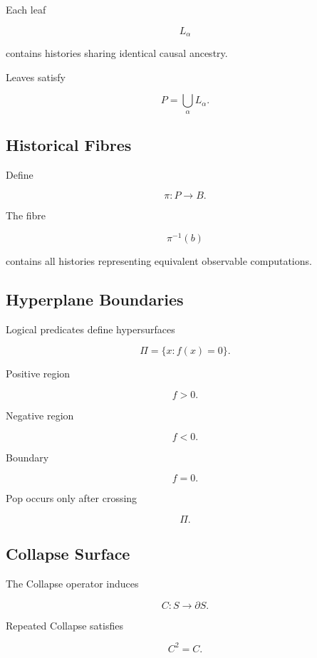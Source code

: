 \documentclass[12pt,oneside]{article}
\theoremstyle{definition}
\theoremstyle{remark}
\begin{document}
Each leaf

\[
L_\alpha
\]

contains histories sharing identical causal ancestry.

Leaves satisfy

\[
P
=
\bigcup_\alpha
L_\alpha.
\]

\subsection*{Historical Fibres}

Define

\[
\pi
:
P
\rightarrow
B.
\]

The fibre

\[
\pi^{-1}(b)
\]

contains all histories representing equivalent observable computations.

\subsection*{Hyperplane Boundaries}

Logical predicates define hypersurfaces

\[
\Pi
=
\{
x
:
f(x)=0
\}.
\]

Positive region

\[
f>0.
\]

Negative region

\[
f<0.
\]

Boundary

\[
f=0.
\]

Pop occurs only after crossing

\[
\Pi.
\]

\subsection*{Collapse Surface}

The Collapse operator induces

\[
C
:
S
\rightarrow
\partial S.
\]

Repeated Collapse satisfies

\[
C^2=C.
\]
\end{document}
